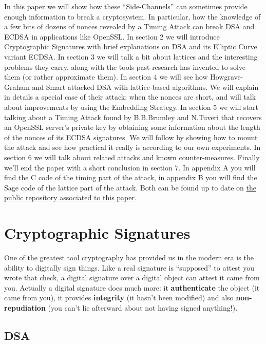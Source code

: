 \documentclass[a4paper,11pt]{article}
\begin{document}
In this paper we will show how these ``Side-Channels'' can sometimes provide enough information to break a cryptosystem. In particular, how the knowledge of a few bits of dozens of nonces revealed by a Timing Attack can break DSA and ECDSA in applications like OpenSSL. In section 2 we will introduce Cryptographic Signatures with brief explanations on DSA and its Elliptic Curve variant ECDSA. In section 3 we will talk a bit about lattices and the interesting problems they carry, along with the tools past research has invented to solve them (or rather approximate them). In section 4 we will see how Howgrave-Graham and Smart attacked DSA with lattice-based algorithms. We will explain in details a special case of their attack: when the nonces are short, and will talk about improvements by using the Embedding Strategy. In section 5 we will start talking about a Timing Attack found by B.B.Brumley and N.Tuveri that recovers an OpenSSL server's private key by obtaining some information about the length of the nonces of its ECDSA signatures. We will follow by showing how to mount the attack and see how practical it really is according to our own experiments. In section 6 we will talk about related attacks and known counter-measures. Finally we'll end the paper with a short conclusion in section 7. In appendix A you will find the C code of the timing part of the attack, in appendix B you will find the Sage code of the lattice part of the attack. Both can be found up to date on \href{https://github.com/mimoo/timing_attack_ecdsa_tls}{the public repository associated to this paper}.

\section{Cryptographic Signatures}\label{rsa}


One of the greatest tool cryptography has provided us in the modern era is the ability to digitally sign things. Like a real signature is ``supposed'' to attest you wrote that check, a digital signature over a digital object can attest it came from you. Actually a digital signature does much more: it \textbf{authenticate} the object (it came from you), it provides \textbf{integrity} (it hasn't been modified) and also \textbf{non-repudiation} (you can't lie afterward about not having signed anything!).

\subsection{DSA}\label{dsa}
\end{document}
